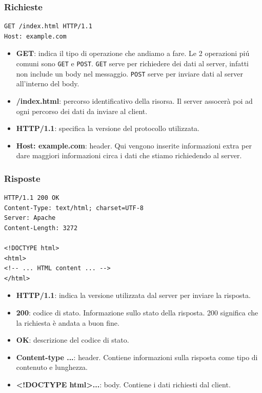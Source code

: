 \subsubsection{Richieste}
\begin{verbatim}
GET /index.html HTTP/1.1
Host: example.com
\end{verbatim}
\begin{itemize}[label={}]
  \item \textbf{GET}: indica il tipo di operazione che andiamo a fare. Le 2 operazioni piú comuni sono \texttt{GET} e \texttt{POST}. \texttt{GET} serve per richiedere dei dati al server, infatti non include un body nel messaggio. \texttt{POST} serve per inviare dati al server all'interno del body.
  \item \textbf{/index.html}: percorso identificativo della risorsa. Il server assocerà poi ad ogni percorso dei dati da inviare al client.
  \item \textbf{HTTP/1.1}: specifica la versione del protocollo utilizzata.
  \item \textbf{Host: example.com}: header. Qui vengono inserite informazioni extra per dare maggiori informazioni circa i dati che stiamo richiedendo al server.
\end{itemize}

\subsubsection{Risposte}
\begin{verbatim}
HTTP/1.1 200 OK
Content-Type: text/html; charset=UTF-8
Server: Apache
Content-Length: 3272

<!DOCTYPE html>
<html>
<!-- ... HTML content ... -->
</html>
\end{verbatim}
\begin{itemize}[label={}]
  \item \textbf{HTTP/1.1}: indica la versione utilizzata dal server per inviare la risposta.
  \item \textbf{200}: codice di stato. Informazione sullo stato della risposta. 200 significa che la richiesta è andata a buon fine.
  \item \textbf{OK}: descrizione del codice di stato.
  \item \textbf{Content-type ...}: header. Contiene informazioni sulla risposta come tipo di contenuto e lunghezza.
  \item \textbf{\textless!DOCTYPE html\textgreater ...}: body. Contiene i dati richiesti dal client.
\end{itemize}
